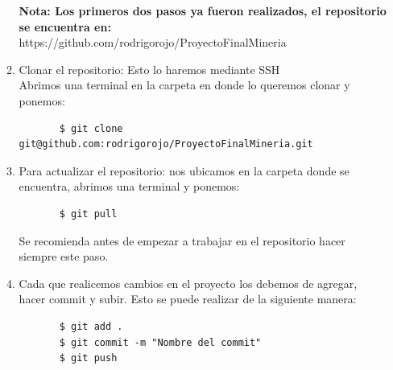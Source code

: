 \documentclass{article}
\begin{document}
\begin{itemize}
\begin{enumerate}
\begin{center}
     \end{center}
     \textbf{Nota: Los primeros dos pasos ya fueron realizados, el repositorio se encuentra en: }\\
     https://github.com/rodrigorojo/ProyectoFinalMineria
     \item Clonar el repositorio: Esto lo haremos mediante SSH\\
     Abrimos una terminal en la carpeta en donde lo queremos clonar y ponemos:
     \begin{verbatim}
       $ git clone git@github.com:rodrigorojo/ProyectoFinalMineria.git
     \end{verbatim}
     \item Para actualizar el repositorio: nos ubicamos en la carpeta donde se encuentra, abrimos una terminal y ponemos:
     \begin{verbatim}
       $ git pull
     \end{verbatim}
     Se recomienda antes de empezar a trabajar en el repositorio hacer siempre este paso.
     \item Cada que realicemos cambios en el proyecto los debemos de agregar, hacer commit y subir. Esto se puede realizar de la siguiente manera:
     \begin{verbatim}
       $ git add .
       $ git commit -m "Nombre del commit"
       $ git push
     \end{verbatim}


   \end{enumerate}
 \end{itemize}
\end{document}
